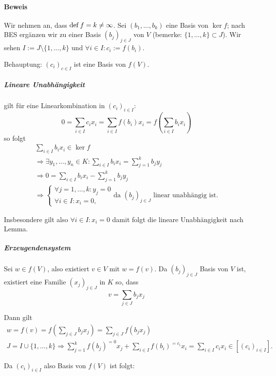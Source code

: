 \paragraph{Beweis}
	Wir nehmen an, dass $ \operatorname{def} f = k \neq \infty $.
	Sei $ (b_1,...,b_k) $ eine Basis von $ \ker f $;
	nach BES ergänzen wir zu einer Basis $ (b_j)_{j\in J} $ von $ V $ (bemerke: $ \{1,...,k\}\subset J $).
	Wir sehen $ I:= J\setminus \{1,...,k\} $ und $ \forall i\in I: c_i := f(b_i) $.
	
	Behauptung: $(c_i)_{c\in I}$ ist eine Basis von $f(V)$.
	
\subparagraph{Lineare Unabhängigkeit}
	gilt für eine Linearkombination in $(c_i)_{i\in I}$:
		\[ 0=\sum_{i\in I}c_ix_i = \sum_{i\in I}f(b_i)x_i = f(\sum_{i\in I}b_ix_i)
		 \]
	so folgt
	\begin{gather*}
		\sum_{i\in I}b_ix_i \in \ker f\\
		\Rightarrow \exists y_1,...,y_n\in K:\sum_{i\in I}b_ix_i=\sum_{j=1}^{k}b_jy_j\\
		\Rightarrow 0 = \sum_{i\in I}b_ix_i - \sum_{j=1}^{k}b_jy_j\\
		\Rightarrow
		\begin{cases}
			\forall j = 1, ... ,k:y_j=0\\
			\forall i\in I: x_i = 0,
		\end{cases}
		\text{da $(b_j)_{j\in J}$ linear unabhängig ist.}
	\end{gather*}
			
	Insbesondere gilt also $\forall i\in I: x_i = 0$ damit folgt die lineare Unabhängigkeit nach Lemma.
	
\subparagraph{Erzeugendensystem}
	
	Sei $w\in f(V)$, also existiert $v\in V$ mit $w = f(v)$. Da $(b_j)_{j\in J}$ Basis von $V$ ist, existiert eine Familie $(x_j)_{j\in J}$ in $K$ so, dass 
	\begin{equation*}
		v = \sum_{j\in J} b_jx_j
	\end{equation*}
	
	Dann gilt
	\begin{gather*}
		w = f(v) = f(\sum_{j\in J} b_jx_j) = \sum_{j\in J}f(b_jx_j)\\
		J=I \cup\{{1,...,k\}} \Rightarrow \sum_{j=1}^{k}f(b_j)^{=0}x_j + \sum_{i\in I}f(b_i)^{=c_i}x_i = \sum_{i\in I}c_ix_i\in[(c_i)_{i\in I}].
	\end{gather*}
			
	Da $(c_i)_{i\in I}$ also Basis von $f(V)$ ist folgt:
			
